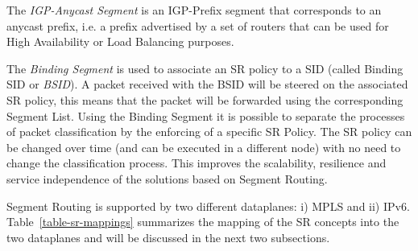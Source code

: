 The \textit{IGP-Anycast Segment} is an IGP-Prefix segment that corresponds to an anycast prefix, i.e. a prefix advertised by a set of routers that can be used for High Availability or Load Balancing purposes. 

The \textit{Binding Segment} is used to associate an SR policy to a SID (called Binding SID or \textit{BSID}). A packet received with the BSID will be steered on the associated SR policy, this means that the packet will be forwarded using the corresponding Segment List. Using the Binding Segment it is possible to separate the processes of packet classification by the enforcing of a specific SR Policy. The SR policy can be changed over time (and can be executed in a different node) with no need to change the classification process. This improves the scalability, resilience and service independence of the solutions based on Segment Routing.

Segment Routing is supported by two different dataplanes: i) MPLS and ii) IPv6. Table~\ref{table-sr-mappings} summarizes the mapping of the SR concepts into the two dataplanes and will be discussed in the next two subsections. 


